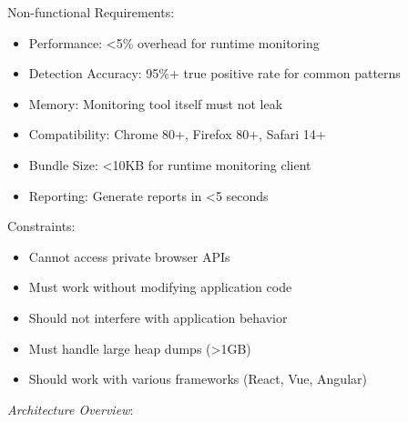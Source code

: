 \documentclass[11pt]{article}
\begin{document}
Non-functional Requirements:

\begin{itemize}
\item Performance: <5\% overhead for runtime monitoring
\item Detection Accuracy: 95\%+ true positive rate for common patterns
\item Memory: Monitoring tool itself must not leak
\item Compatibility: Chrome 80+, Firefox 80+, Safari 14+
\item Bundle Size: <10KB for runtime monitoring client
\item Reporting: Generate reports in <5 seconds
\end{itemize}

Constraints:

\begin{itemize}
\item Cannot access private browser APIs
\item Must work without modifying application code
\item Should not interfere with application behavior
\item Must handle large heap dumps (>1GB)
\item Should work with various frameworks (React, Vue, Angular)
\end{itemize}

\emph{Architecture Overview}:
\end{document}

